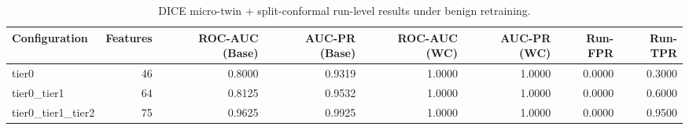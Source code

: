 \begin{table}[t]
\centering
\caption{DICE micro-twin + split-conformal run-level results under benign retraining.}
\label{tab:dice_full_overall}
\footnotesize
\begin{tabular}{lrrrrrrr}
\toprule
Configuration & Features & ROC-AUC (Base) & AUC-PR (Base) & ROC-AUC (WC) & AUC-PR (WC) & Run-FPR & Run-TPR \\
\midrule
tier0 & 46 & 0.8000 & 0.9319 & 1.0000 & 1.0000 & 0.0000 & 0.3000 \\
tier0_tier1 & 64 & 0.8125 & 0.9532 & 1.0000 & 1.0000 & 0.0000 & 0.6000 \\
tier0_tier1_tier2 & 75 & 0.9625 & 0.9925 & 1.0000 & 1.0000 & 0.0000 & 0.9500 \\
\bottomrule
\end{tabular}

\end{table}
